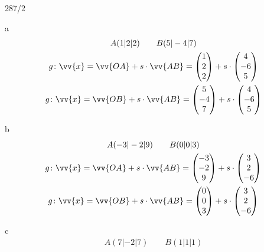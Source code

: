 \begin{exercise}{287/2}
  \item [a]
  \begin{gather*}
    A(1|2|2) \qquad B(5|-4|7) \\
    g \colon \vv{x} = \vv{OA} + s \cdot \vv{AB} = \begin{pmatrix}1 \\ 2 \\ 2\end{pmatrix} + s \cdot \begin{pmatrix}4 \\ -6 \\ 5\end{pmatrix} \\
    g \colon \vv{x} = \vv{OB} + s \cdot \vv{AB} = \begin{pmatrix}5 \\ -4 \\ 7\end{pmatrix} + s \cdot \begin{pmatrix}4 \\ -6 \\ 5\end{pmatrix}
  \end{gather*}
  \item [b]
  \begin{gather*}
    A(-3|-2|9) \qquad B(0|0|3) \\
    g \colon \vv{x} = \vv{OA} + s \cdot \vv{AB} = \begin{pmatrix}-3 \\ -2 \\ 9\end{pmatrix} + s \cdot \begin{pmatrix}3 \\ 2 \\ -6\end{pmatrix} \\
    g \colon \vv{x} = \vv{OB} + s \cdot \vv{AB} = \begin{pmatrix}0 \\ 0 \\ 3\end{pmatrix} + s \cdot \begin{pmatrix}3 \\ 2 \\ -6\end{pmatrix}
  \end{gather*}
  \item [c]
  \begin{gather*}
    A(7|-2|7) \qquad B(1|1|1) \\

\end{gather*}
\end{exercise}
